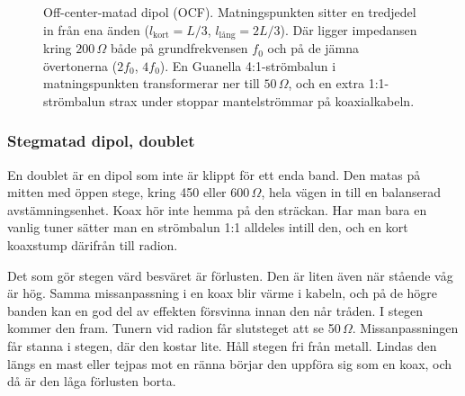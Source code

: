 \begin{figure}[H]
\caption{Off-center-matad dipol (OCF). Matningspunkten sitter en tredjedel in
från ena änden ($l_{\text{kort}} = L/3$, $l_{\text{lång}} = 2L/3$). Där ligger
impedansen kring $200\,\Omega$ både på grundfrekvensen $f_0$ och på de jämna
övertonerna ($2f_0$, $4f_0$). En Guanella 4:1-strömbalun i matningspunkten
transformerar ner till $50\,\Omega$, och en extra 1:1-strömbalun strax under
stoppar mantelströmmar på koaxialkabeln.}
\label{fig:ocf}
\end{figure}

\subsubsection{Stegmatad dipol, doublet}

En doublet är en dipol som inte är klippt för ett enda band. Den matas
på mitten med öppen stege, kring 450 eller 600\,$\Omega$, hela vägen
in till en balanserad avstämningsenhet. Koax hör inte hemma på den
sträckan. Har man bara en vanlig tuner sätter man en strömbalun 1:1
alldeles intill den, och en kort koaxstump därifrån till radion.

Det som gör stegen värd besväret är förlusten. Den är liten även när
stående våg är hög. Samma missanpassning i en koax blir värme i
kabeln, och på de högre banden kan en god del av effekten försvinna
innan den når tråden. I stegen kommer den fram. Tunern vid radion får
slutsteget att se 50\,$\Omega$. Missanpassningen får stanna i stegen,
där den kostar lite. Håll stegen fri från metall. Lindas den längs en
mast eller tejpas mot en ränna börjar den uppföra sig som en koax, och
då är den låga förlusten borta.

